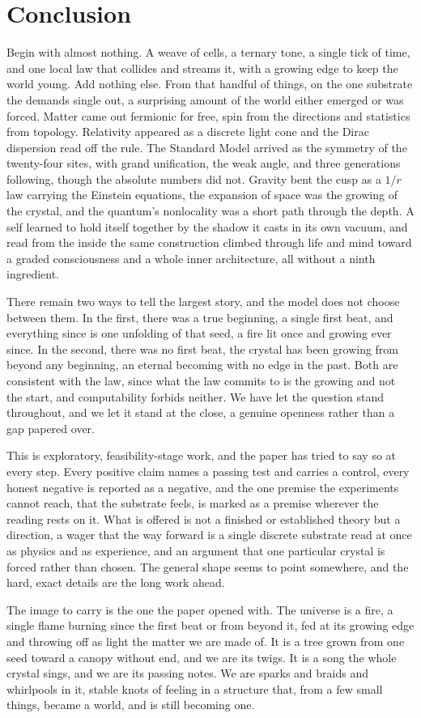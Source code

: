 \section{Conclusion}

Begin with almost nothing. A weave of cells, a ternary tone, a single tick of time, and one local law that collides and streams it, with a growing edge to keep the world young. Add nothing else. From that handful of things, on the one substrate the demands single out, a surprising amount of the world either emerged or was forced. Matter came out fermionic for free, spin from the directions and statistics from topology. Relativity appeared as a discrete light cone and the Dirac dispersion read off the rule. The Standard Model arrived as the symmetry of the twenty-four sites, with grand unification, the weak angle, and three generations following, though the absolute numbers did not. Gravity bent the cusp as a $1/r$ law carrying the Einstein equations, the expansion of space was the growing of the crystal, and the quantum's nonlocality was a short path through the depth. A self learned to hold itself together by the shadow it casts in its own vacuum, and read from the inside the same construction climbed through life and mind toward a graded consciousness and a whole inner architecture, all without a ninth ingredient.

There remain two ways to tell the largest story, and the model does not choose between them. In the first, there was a true beginning, a single first beat, and everything since is one unfolding of that seed, a fire lit once and growing ever since. In the second, there was no first beat, the crystal has been growing from beyond any beginning, an eternal becoming with no edge in the past. Both are consistent with the law, since what the law commits to is the growing and not the start, and computability forbids neither. We have let the question stand throughout, and we let it stand at the close, a genuine openness rather than a gap papered over.

This is exploratory, feasibility-stage work, and the paper has tried to say so at every step. Every positive claim names a passing test and carries a control, every honest negative is reported as a negative, and the one premise the experiments cannot reach, that the substrate feels, is marked as a premise wherever the reading rests on it. What is offered is not a finished or established theory but a direction, a wager that the way forward is a single discrete substrate read at once as physics and as experience, and an argument that one particular crystal is forced rather than chosen. The general shape seems to point somewhere, and the hard, exact details are the long work ahead.

The image to carry is the one the paper opened with. The universe is a fire, a single flame burning since the first beat or from beyond it, fed at its growing edge and throwing off as light the matter we are made of. It is a tree grown from one seed toward a canopy without end, and we are its twigs. It is a song the whole crystal sings, and we are its passing notes. We are sparks and braids and whirlpools in it, stable knots of feeling in a structure that, from a few small things, became a world, and is still becoming one.
